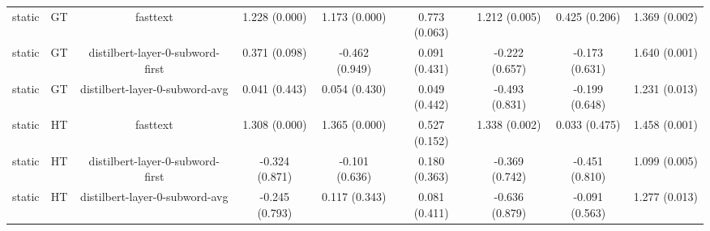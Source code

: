 \begin{sidewaystable}[htb]
\begin{tabular}{@{}ccccccccc@{}}
        static & GT & fasttext & 1.228 (0.000) & 1.173 (0.000) & 0.773 (0.063) & 1.212 (0.005) & 0.425 (0.206) & 1.369 (0.002) \\
        static & GT & distilbert-layer-0-subword-first & 0.371 (0.098) & -0.462 (0.949) & 0.091 (0.431) & -0.222 (0.657) & -0.173 (0.631) & 1.640 (0.001) \\
        static & GT & distilbert-layer-0-subword-avg & 0.041 (0.443) & 0.054 (0.430) & 0.049 (0.442) & -0.493 (0.831) & -0.199 (0.648) & 1.231 (0.013) \\
        static & HT & fasttext & 1.308 (0.000) & 1.365 (0.000) & 0.527 (0.152) & 1.338 (0.002) & 0.033 (0.475) & 1.458 (0.001) \\
        static & HT & distilbert-layer-0-subword-first & -0.324 (0.871) & -0.101 (0.636) & 0.180 (0.363) & -0.369 (0.742) & -0.451 (0.810) & 1.099 (0.005) \\
        static & HT & distilbert-layer-0-subword-avg & -0.245 (0.793) & 0.117 (0.343) & 0.081 (0.411) & -0.636 (0.879) & -0.091 (0.563) & 1.277 (0.013) \\
        \bottomrule
    \end{tabular}
\end{sidewaystable}